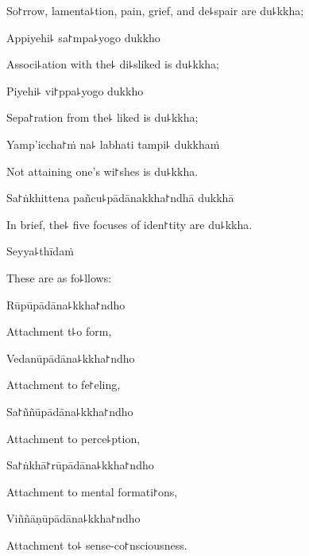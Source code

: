\begin{english}
  So꜓rrow, lamenta꜕tion, pain, grief, and de꜕spair are du꜕kkha;
\end{english}

Appiyehi꜕ sa꜓mpa꜕yogo dukkho

\begin{english}
  Associ꜕ation with the꜕ di꜕sliked is du꜕kkha;
\end{english}

Piyehi꜕ vi꜓ppa꜕yogo dukkho

\begin{english}
  Sepa꜓ration from the꜕ liked is du꜕kkha;
\end{english}

Yamp'iccha꜓ṁ na꜕ labhati tampi꜕ dukkhaṁ

\begin{english}
  Not attaining one's wi꜓shes is du꜕kkha.
\end{english}

Sa꜓ṅkhittena pañcu꜕pādānakkha꜓ndhā dukkhā

\begin{english}
  In brief, the꜕ five focuses of iden꜓tity are du꜕kkha.
\end{english}

Seyya꜕thīdaṁ

\begin{english}
  These are as fo꜕llows:
\end{english}

Rūpūpādāna꜕kkha꜓ndho

\begin{english}
  Attachment t꜕o form,
\end{english}

Vedanūpādāna꜕kkha꜓ndho

\begin{english}
  Attachment to fe꜓eling,
\end{english}

Sa꜓ññūpādāna꜕kkha꜓ndho

\begin{english}
  Attachment to perce꜕ption,
\end{english}

Sa꜓ṅkhā꜓rūpādāna꜕kkha꜓ndho

\begin{english}
  Attachment to mental formati꜓ons,
\end{english}

Viññāṇūpādāna꜕kkha꜓ndho

\begin{english}
  Attachment to꜕ sense-co꜓nsciousness.
\end{english}

